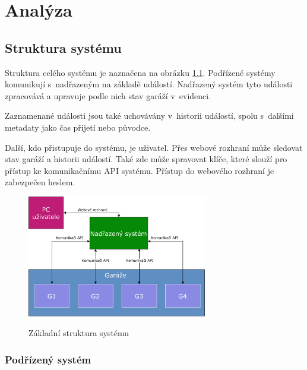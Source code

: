 \chapter{Analýza}
\label{sec:an}

\section{Struktura systému}

Struktura celého systému je naznačena na obrázku \ref{fig:basic_struct}. Podřízené systémy komunikují s~nadřazeným na základě událostí. Nadřazený systém tyto události zpracovává a upravuje podle nich stav garáží v~evidenci. 

Zaznamenané události jsou také uchovávány v~historii událostí, spolu s~dalšími metadaty jako čas přijetí nebo původce.


Další, kdo přistupuje do systému, je uživatel. Přes webové rozhraní může sledovat stav garáží a historii událostí. Také zde může spravovat klíče, které slouží pro přístup ke komunikačnímu API systému. Přístup do webového rozhraní je zabezpečen heslem. 

\begin{figure}[h!]
    \centering
    \includegraphics[width=0.7\textwidth]{images/basic_struct.pdf}
    \label{fig:basic_struct}
    \caption{Základní struktura systému}
\end{figure}

\subsection{Podřízený systém}

